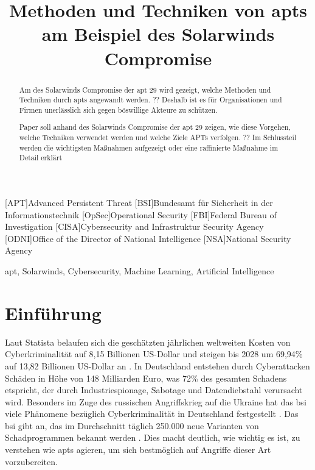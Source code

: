 \documentclass[conference]{IEEEtran}
\begin{document}
\begin{acronym}
    [APT]{Advanced Persistent Threat}
    [BSI]{Bundesamt für Sicherheit in der Informationstechnik}
    [OpSec]{Operational Security}
    [FBI]{Federal Bureau of Investigation}
    [CISA]{Cybersecurity and Infrastruktur Security Agency}
    [ODNI]{Office of the Director of National Intelligence}
    [NSA]{National Security Agency}
\end{acronym}


\title{Methoden und Techniken von \aclp*{apt} am Beispiel des Solarwinds Compromise
}

\author{
}

\maketitle

\begin{abstract}
    Am des Solarwinds Compromise der \acs*{apt} 29 wird gezeigt, welche Methoden und Techniken durch \acsp*{apt} angewandt werden.
    ?? Deshalb ist es für Organisationen und Firmen unerlässlich sich gegen böswillige Akteure zu schützen.

    Paper soll anhand des Solarwinds Compromise der \ac{apt} 29 zeigen, wie diese Vorgehen, welche Techniken verwendet werden und welche Ziele APTs verfolgen.
    ?? Im Schlussteil werden die wichtigsten Maßnahmen aufgezeigt oder eine raffinierte Maßnahme im Detail erklärt
\end{abstract}

\begin{IEEEkeywords}
    \ac{apt}, Solarwinds, Cybersecurity, Machine Learning, Artificial Intelligence
\end{IEEEkeywords}

\section{Einführung}
\label{sec:introduction}

Laut Statista belaufen sich die geschätzten jährlichen weltweiten Kosten von Cyberkriminalität auf 8,15 Billionen US-Dollar und steigen bis 2028 um 69,94\% auf 13,82 Billionen US-Dollar an \cite{Statista2023}.
In Deutschland entstehen durch Cyberattacken Schäden in Höhe von 148 Milliarden Euro, was 72\% des gesamten Schadens etspricht, der durch Industriespionage, Sabotage und Datendiebstahl verursacht wird.
Besonders im Zuge des russischen Angriffskrieg auf die Ukraine hat das \ac{bsi} viele Phänomene bezüglich Cyberkriminalität in Deutschland festgestellt \cite[S.~25]{BSI2023}.
Das \ac{bsi} gibt an, das im Durchschnitt täglich 250.000 neue Varianten von Schadprogrammen bekannt werden \cite[S.~13]{BSI2023}.
Dies macht deutlich, wie wichtig es ist, zu verstehen wie \acp{apt} agieren, um sich bestmöglich auf Angriffe dieser Art vorzubereiten.
\end{document}
